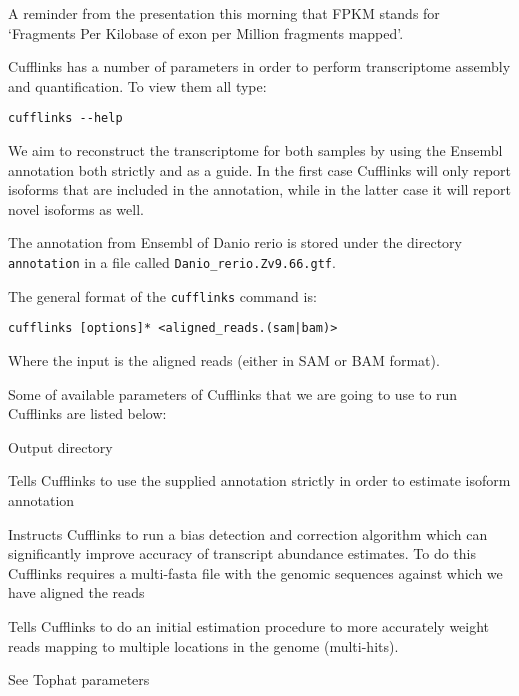 A reminder from the presentation this morning that FPKM stands for `Fragments
Per Kilobase of exon per Million fragments mapped'. 

\begin{steps}
Cufflinks has a number of parameters in order to perform transcriptome
assembly and quantification. To view them all type:

\begin{lstlisting}
cufflinks --help
\end{lstlisting}
\end{steps}

We aim to reconstruct the transcriptome for both samples by using the Ensembl
annotation both strictly and as a guide. In the first case Cufflinks will only
report isoforms that are included in the annotation, while in the latter case
it will report novel isoforms as well.

The annotation from Ensembl of Danio rerio is stored under the directory
\texttt{annotation} in a file called \texttt{Danio\_rerio.Zv9.66.gtf}.

\begin{information}
The general format of the \texttt{cufflinks} command is:
\begin{lstlisting}
cufflinks [options]* <aligned_reads.(sam|bam)>
\end{lstlisting}
Where the input is the aligned reads (either in SAM or BAM format).
\end{information}

\begin{note}
Some of available parameters of Cufflinks that we are going to use to run
Cufflinks are listed below:
\begin{description}[style=multiline,labelindent=0cm,align=right,leftmargin=\descriptionlabelspace,rightmargin=1.5cm,font=\ttfamily]
  \item[-o] Output directory
  \item[-G] Tells Cufflinks to use the supplied annotation strictly in order
  to estimate isoform annotation
  \item[-b] Instructs Cufflinks to run a bias detection and correction algorithm
  which can significantly improve accuracy of transcript abundance estimates.
  To do this Cufflinks requires a multi-fasta file with the genomic sequences
  against which we have aligned the reads
  \item[-u] Tells Cufflinks to do an initial estimation procedure to more
  accurately weight reads mapping to multiple locations in the genome
  (multi-hits). 
  \item[--library-type] See Tophat parameters
\end{description}
\end{note}


